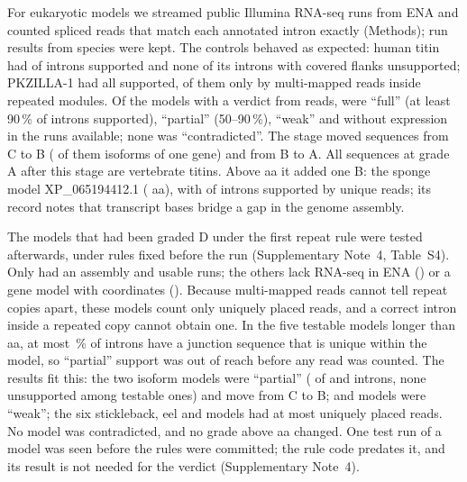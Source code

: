 \documentclass[11pt]{article}
\begin{document}
For eukaryotic models we streamed public Illumina RNA-seq runs from ENA and counted spliced reads that match each
annotated intron exactly (Methods);  run results from  species were kept. The controls
behaved as expected: human titin had  of  introns supported and
none of its  introns with covered flanks unsupported; PKZILLA-1 had all 
supported,  of them only by multi-mapped reads inside repeated modules. Of the
 models with a verdict from reads,  were ``full'' (at least 90\,\% of introns
supported),  ``partial'' (50--90\,\%),  ``weak'' and  without expression in
the runs available; none was ``contradicted''. The stage moved  sequences from C to B
( of them isoforms of one  gene) and  from B to
A. All  sequences at grade A after this stage are vertebrate titins. Above  aa it added one B:
the sponge  model XP\_065194412.1 ( aa), with  of
 introns supported by unique reads; its record notes that  transcript bases
bridge a gap in the genome assembly.

The  models that had been graded D under the first repeat rule were tested afterwards, under rules fixed
before the run (Supplementary Note~4, Table~S4). Only  had an assembly and usable runs; the others lack
RNA-seq in ENA () or a gene model with coordinates (). Because
multi-mapped reads cannot tell repeat copies apart, these models count only uniquely placed reads, and a correct intron
inside a repeated copy cannot obtain one. In the five testable models longer than  aa, at most
\,\% of introns have a junction sequence that is unique within the model, so ``partial'' support was out
of reach before any read was counted. The results fit this: the two  isoform models were
``partial'' ( of  and  introns, none
unsupported among  testable ones) and move from C to B;  and  models
were ``weak''; the six stickleback, eel and  models had at most  uniquely placed
reads. No model was contradicted, and no grade above  aa changed. One test run of a  model
was seen before the rules were committed; the rule code predates it, and its result is not needed for the verdict
(Supplementary Note~4).
\end{document}
